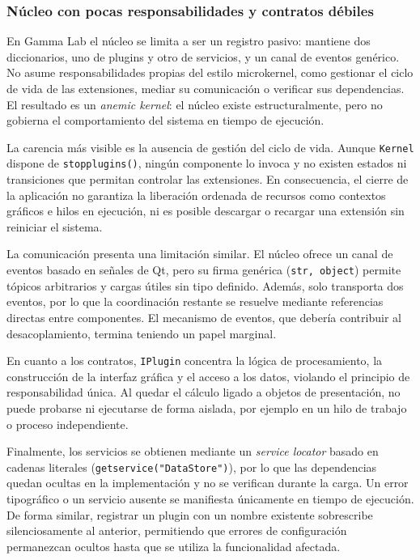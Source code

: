 \documentclass[11pt,a4paper]{article}
\DeclareRobustCommand{\_}{\textunderscore\allowbreak}
\begin{document}
\subsubsection{Núcleo con pocas responsabilidades y contratos débiles}
\label{sec:diag_nucleo}

En Gamma Lab el núcleo se limita a ser un registro pasivo: mantiene dos diccionarios, uno de plugins y otro de servicios, y un canal de eventos genérico. No asume responsabilidades propias del estilo microkernel, como gestionar el ciclo de vida de las extensiones, mediar su comunicación o verificar sus dependencias. El resultado es un \textit{anemic kernel}: el núcleo existe estructuralmente, pero no gobierna el comportamiento del sistema en tiempo de ejecución.

La carencia más visible es la ausencia de gestión del ciclo de vida. Aunque \texttt{Kernel} dispone de \texttt{stop\_plugins()}, ningún componente lo invoca y no existen estados ni transiciones que permitan controlar las extensiones. En consecuencia, el cierre de la aplicación no garantiza la liberación ordenada de recursos como contextos gráficos e hilos en ejecución, ni es posible descargar o recargar una extensión sin reiniciar el sistema.

La comunicación presenta una limitación similar. El núcleo ofrece un canal de eventos basado en señales de Qt, pero su firma genérica (\texttt{str, object}) permite tópicos arbitrarios y cargas útiles sin tipo definido. Además, solo transporta dos eventos, por lo que la coordinación restante se resuelve mediante referencias directas entre componentes. El mecanismo de eventos, que debería contribuir al desacoplamiento, termina teniendo un papel marginal.

En cuanto a los contratos, \texttt{IPlugin} concentra la lógica de procesamiento, la construcción de la interfaz gráfica y el acceso a los datos, violando el principio de responsabilidad única. Al quedar el cálculo ligado a objetos de presentación, no puede probarse ni ejecutarse de forma aislada, por ejemplo en un hilo de trabajo o proceso independiente.

Finalmente, los servicios se obtienen mediante un \textit{service locator} basado en cadenas literales (\texttt{get\_service("DataStore")}), por lo que las dependencias quedan ocultas en la implementación y no se verifican durante la carga. Un error tipográfico o un servicio ausente se manifiesta únicamente en tiempo de ejecución. De forma similar, registrar un plugin con un nombre existente sobrescribe silenciosamente al anterior, permitiendo que errores de configuración permanezcan ocultos hasta que se utiliza la funcionalidad afectada.
\end{document}
